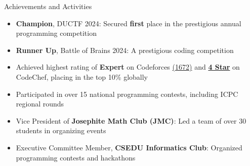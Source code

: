 \documentclass[10pt,oneside]{article}
\newenvironment{ressection}[1]{
  \vspace{4pt}
  {\fontfamily{phv}\selectfont\Large#1}
  \begin{itemize}
  \vspace{3pt}
}{
  \end{itemize}
}
\newcommand{\resitem}[1]{
  \vspace{-4pt}
  \item \begin{flushleft} #1 \end{flushleft}
}
\begin{document}
\begin{ressection}{Achievements and Activities}
    \resitem{\textbf{Champion}, DUCTF 2024: Secured \textbf{first} place in the prestigious annual programming competition}

  \resitem{\textbf{Runner Up}, Battle of Brains 2024: A prestigious coding competition}

  \resitem{Achieved highest rating of \textbf{Expert} on Codeforces \href{https://codeforces.com/profile/m_ithunvoe}{(1672)} and \textbf{\href{https://www.codechef.com/users/kabyasaha1812}{4 Star}} on CodeChef, placing in the top 10\% globally}

  \resitem{Participated in over 15 national programming contests, including ICPC regional rounds}
    
  \resitem{Vice President of \textbf{Josephite Math Club (JMC)}: Led a team of over 30 students in organizing events}


  \resitem{Executive Committee Member, \textbf{CSEDU Informatics Club}: Organized programming contests and hackathons}

\end{ressection}
\end{document}
